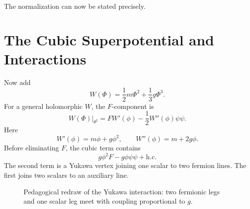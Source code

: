The normalization can now be stated precisely.

\section{The Cubic Superpotential and Interactions}

Now add
\begin{equation}
W(\Phi)=\frac12m\Phi^2+\frac13g\Phi^3.
\label{eq:l8-superpotential}
\end{equation}
For a general holomorphic \(W\), the \(F\)-component is
\begin{equation}
\left.W(\Phi)\right|_{\theta^2}
=F W'(\phi)-\frac12W''(\phi)\psi\psi.
\label{eq:l8-W-components}
\end{equation}
Here
\begin{equation}
W'(\phi)=m\phi+g\phi^2,
\qquad
W''(\phi)=m+2g\phi.
\end{equation}
Before eliminating \(F\), the cubic term contains
\begin{equation}
g\phi^2F-g\phi\psi\psi+\text{h.c.}
\label{eq:l8-cubic-offshell}
\end{equation}
The second term is a Yukawa vertex joining one scalar to two fermion lines. The first joins two scalars to an auxiliary line.

\begin{figure}[H]
\centering
{}
\caption{Pedagogical redraw of the Yukawa interaction: two fermionic legs and one scalar leg meet with coupling proportional to \(g\).}
\end{figure}

